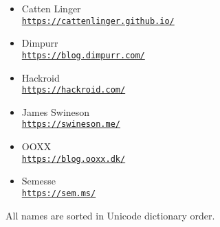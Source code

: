 


\newcommand{\sgitem}[2]{
    \noindent%
    \parbox[t][16mm][t]{\linewidth}{%
    \parskip=3pt
        \rmfamily\Large\mdseries\myvphantom#1\par
        \ttfamily\small\mdseries\myvphantom\href{#2}{#2}\par
    }\par
}
\newcommand{\sgitemalt}[2]{
    \item \textrm{\large#1}\nopagebreak\\\nopagebreak\texttt{\small\href{#2}{#2}}
}



\begin{itemize}
    \sgitemalt{Catten Linger}{https://cattenlinger.github.io/}
    \sgitemalt{Dimpurr}{https://blog.dimpurr.com/}
    \sgitemalt{Hackroid}{https://hackroid.com/}
    \sgitemalt{James Swineson}{https://swineson.me/}
    \sgitemalt{OOXX}{https://blog.ooxx.dk/}
    \sgitemalt{Semesse}{https://sem.ms/}
\end{itemize}


\vskip 20mm\vfill\small\rmfamily
All names are sorted in Unicode dictionary order.




